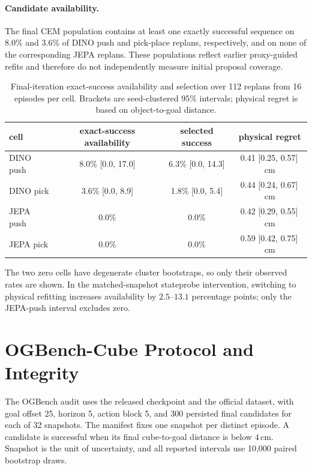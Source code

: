 \documentclass[10pt]{article}
\begin{document}
\paragraph{Candidate availability.}\label{app:availability}
The final CEM population contains at least one exactly successful sequence on
$8.0\%$ and $3.6\%$ of DINO push and pick-place replans, respectively, and on
none of the corresponding JEPA replans. These populations reflect earlier
proxy-guided refits and therefore do not independently measure initial proposal
coverage.

\begin{table}[ht]
\centering
\small
\caption{Final-iteration exact-success availability and selection over 112
replans from 16 episodes per cell. Brackets are seed-clustered 95\% intervals;
physical regret is based on object-to-goal distance.}
\label{tab:availability}
\begin{tabular}{lccc}
\toprule
cell & exact-success availability & selected success & physical regret \\
\midrule
DINO push & 8.0\% [0.0, 17.0] & 6.3\% [0.0, 14.3] & 0.41 [0.25, 0.57]\,cm \\
DINO pick & 3.6\% [0.0, 8.9] & 1.8\% [0.0, 5.4] & 0.44 [0.24, 0.67]\,cm \\
JEPA push & 0.0\% & 0.0\% & 0.42 [0.29, 0.55]\,cm \\
JEPA pick & 0.0\% & 0.0\% & 0.59 [0.42, 0.75]\,cm \\
\bottomrule
\end{tabular}
\end{table}

The two zero cells have degenerate cluster bootstraps, so only their observed
rates are shown. In the matched-snapshot stateprobe intervention, switching to
physical refitting increases availability by $2.5$--$13.1$ percentage points;
only the JEPA-push interval excludes zero.

\section{OGBench-Cube Protocol and Integrity}\label{app:ogbench}

The OGBench audit uses the released
 checkpoint and the official
 dataset, with goal offset 25, horizon 5,
action block 5, and 300 persisted final candidates for each of 32 snapshots.
The manifest fixes one snapshot per distinct episode. A candidate is successful
when its final cube-to-goal distance is below $4$\,cm. Snapshot is the unit of
uncertainty, and all reported intervals use 10,000 paired bootstrap draws.
\end{document}
